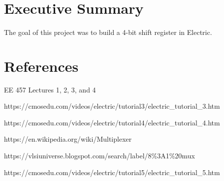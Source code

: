 \documentclass{article}
\begin{document}



\tableofcontents

\newpage
{}

\section{Executive Summary}
  \paragraph{}
  The goal of this project was to build a 4-bit shift register in Electric.  



\newpage
\section{References}

\noindent [\text{1}] EE 457 Lectures 1, 2, 3, and 4

\noindent [\text{2}] https://cmosedu.com/videos/electric/tutorial3/electric\_tutorial\_3.htm 

\noindent [\text{3}] https://cmosedu.com/videos/electric/tutorial4/electric\_tutorial\_4.htm 

\noindent [\text{4}] https://en.wikipedia.org/wiki/Multiplexer

\noindent [\text{5}] https://vlsiuniverse.blogspot.com/search/label/8\%3A1\%20mux

\noindent [\text{6}] https://cmosedu.com/videos/electric/tutorial5/electric\_tutorial\_5.htm 
\end{document}
